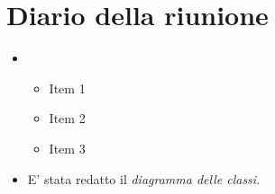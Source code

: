 \section{Diario della riunione}

\begin{itemize}
    \item \lipsum[1]
    \begin{itemize}
        \renewcommand{\labelitemii}{--}
        \item Item 1
        \item Item 2
        \item Item 3
    \end{itemize}
    \item E' stata redatto il \emph{diagramma delle classi}.
\end{itemize}